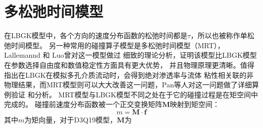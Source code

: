 %


\section{多松弛时间模型}
在LBGK模型中，各个方向的速度分布函数的松弛时间都是$\tau$，所以也被称作单松弛时间模型。
另一种常用的碰撞算子模型是多松弛时间模型（MRT）， Lallemannd 和 Luo曾对这一模型做过
细致的理论分析，证明该模型比LBGK模型在参数选择自由度和数值稳定性方面具有更大优势，
并且物理原理更清晰。值得指出在LBGK在模拟多孔介质流动时，会得到绝对渗透率与流体
粘性相关联的非物理结果，而MRT模型则可以大大改善这一问题，Pan等人对这一问题做了详细算例验证
和分析。
MRT模型与LBGK模型不同之处在于它的碰撞过程是在矩空间中完成的。
碰撞前速度分布函数被一个正交变换矩阵$\bm M$映射到矩空间：
\begin{equation}
  m = \bm M \cdot \bm f
  \label{M_to_f}
\end{equation}
其中$m$为矩向量，对于D3Q19模型，$\bm M$为
  \renewcommand{\baselinestretch}{1.25}

